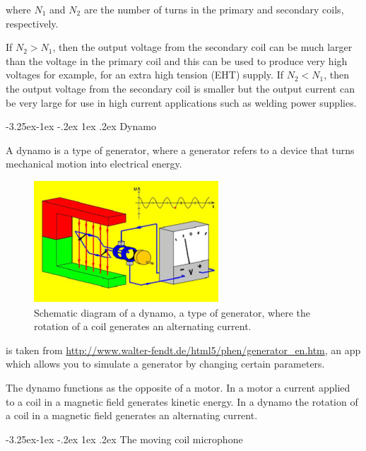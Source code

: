 \documentclass[
]{book}
\makeatletter
\renewcommand\subsection{%
\@startsection{subsection}{2}{\z@}%
              {-3.25ex\@plus -1ex \@minus -.2ex}%
              {1ex \@plus .2ex}%
              {\sffamily\bfseries}}
\numberwithin{equation}{section}
\makeatother
\begin{document}
where \(N_1\) and \(N_2\) are the number of turns in the primary and
secondary coils, respectively.

If \(N_2 > N_1\), then the output voltage from the secondary coil can be
much larger than the voltage in the primary coil and this can be used to
produce very high voltages for example, for an extra high tension (EHT)
supply. If \(N_2 < N_1\), then the output voltage from the secondary coil
is smaller but the output current can be very large for use in high
current applications such as welding power supplies.

\hypertarget{dynamo}{%
\subsection{Dynamo}\label{dynamo}}

A dynamo is a type of generator, where a generator refers to a device
that turns mechanical motion into electrical energy.

\begin{figure}

{\centering \includegraphics[width=0.7\linewidth]{Figures/dynamo} 

}

\caption{Schematic diagram of a dynamo, a type of generator, where the rotation of a coil generates an alternating current.}\label{fig:dynamo}
\end{figure}

is taken from \url{http://www.walter-fendt.de/html5/phen/generator_en.htm},
an app which allows you to simulate a generator by changing certain
parameters.

The dynamo functions as the opposite of a motor. In a motor a current
applied to a coil in a magnetic field generates kinetic energy. In a
dynamo the rotation of a coil in a magnetic field generates an
alternating current.

\hypertarget{the-moving-coil-microphone}{%
\subsection{The moving coil microphone}\label{the-moving-coil-microphone}}
\end{document}
